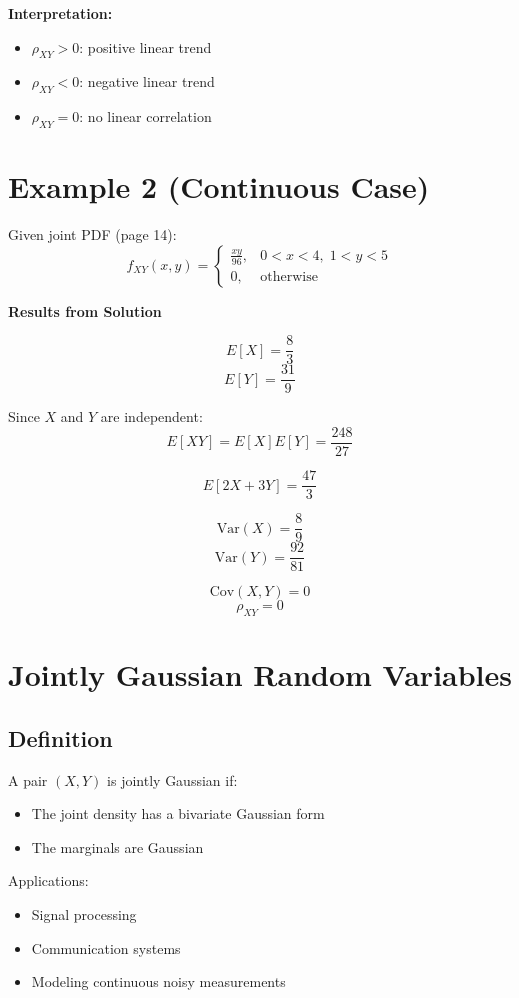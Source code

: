 \documentclass[12pt]{article}
\begin{document}
\textbf{Interpretation:}
\begin{itemize}
    \item $\rho_{XY} > 0$: positive linear trend
    \item $\rho_{XY} < 0$: negative linear trend
    \item $\rho_{XY} = 0$: no linear correlation
\end{itemize}

\section{Example 2 (Continuous Case)}

Given joint PDF (page 14):
\[
f_{XY}(x,y) =
\begin{cases}
\frac{xy}{96}, & 0 < x < 4, \; 1 < y < 5 \\
0, & \text{otherwise}
\end{cases}
\]

\textbf{Results from Solution}

\[
E[X] = \frac{8}{3}
\]
\[
E[Y] = \frac{31}{9}
\]

Since $X$ and $Y$ are independent:
\[
E[XY] = E[X]E[Y] = \frac{248}{27}
\]

\[
E[2X + 3Y] = \frac{47}{3}
\]

\[
\text{Var}(X) = \frac{8}{9}
\]
\[
\text{Var}(Y) = \frac{92}{81}
\]

\[
\text{Cov}(X,Y) = 0
\]
\[
\rho_{XY} = 0
\]

\section{Jointly Gaussian Random Variables}

\subsection{Definition}

A pair $(X,Y)$ is jointly Gaussian if:
\begin{itemize}
    \item The joint density has a bivariate Gaussian form
    \item The marginals are Gaussian
\end{itemize}

Applications:
\begin{itemize}
    \item Signal processing
    \item Communication systems
    \item Modeling continuous noisy measurements
\end{itemize}
\end{document}
